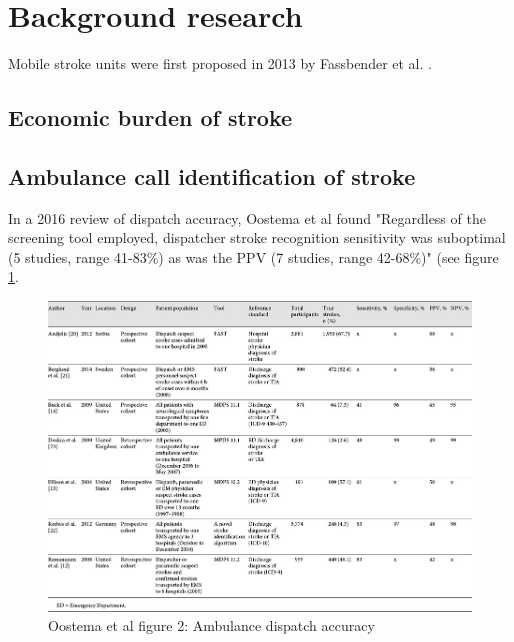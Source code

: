 \section{Background research}

Mobile stroke units were first proposed in 2013 by Fassbender et al. \cite{fassbender_mobile_2003}.


\subsection{Economic burden of stroke}


\subsection{Ambulance call identification of stroke}

In a 2016 review of dispatch accuracy, Oostema et al \cite{oostema_dispatcher_2016} found "Regardless of the screening tool employed, dispatcher stroke recognition sensitivity was suboptimal (5 studies, range 41-83\%) as was the PPV (7 studies, range 42-68\%)" (see figure \ref{fig:oostema}.

\begin{figure}
    \centering
    \includegraphics[width=0.9\linewidth]{images_background/oosetema_dispatch_accuracy}
    \caption{Oostema et al figure 2: Ambulance dispatch accuracy}
    \label{fig:oostema}
\end{figure}

